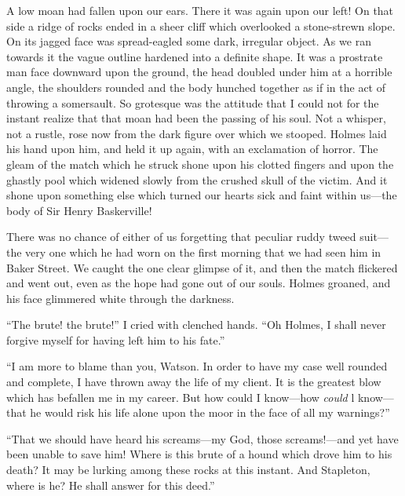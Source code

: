 \documentclass[paper=5.5in:8.5in,BCOR=7mm,twoside,DIV=calc,12pt,usegeometry,openany,chapterprefix,endperiod,headings=big]{scrbook} %
\begin{document}
A low moan had fallen upon our ears. There it was again upon our left! On that side a ridge of rocks ended in a sheer cliff which overlooked a stone-strewn slope. On its jagged face was spread-eagled some dark, irregular object. As we ran towards it the vague outline hardened into a definite shape. It was a prostrate man face downward upon the ground, the head doubled under him at a horrible angle, the shoulders rounded and the body hunched together as if in the act of throwing a somersault. So grotesque was the attitude that I could not for the instant realize that that moan had been the passing of his soul. Not a whisper, not a rustle, rose now from the dark figure over which we stooped. Holmes laid his hand upon him, and held it up again, with an exclamation of horror. The gleam of the match which he struck shone upon his clotted fingers and upon the ghastly pool which widened slowly from the crushed skull of the victim. And it shone upon something else which turned our hearts sick and faint within us---the body of Sir Henry Baskerville!



There was no chance of either of us forgetting that peculiar ruddy tweed suit---the very one which he had worn on the first morning that we had seen him in Baker Street. We caught the one clear glimpse of it, and then the match flickered and went out, even as the hope had gone out of our souls. Holmes groaned, and his face glimmered white through the darkness.

\enquote{The brute! the brute!} I cried with clenched hands. \enquote{Oh Holmes, I shall never forgive myself for having left him to his fate.}

\enquote{I am more to blame than you, Watson. In order to have my case well rounded and complete, I have thrown away the life of my client. It is the greatest blow which has befallen me in my career. But how could I know---how \emph{could} l know---that he would risk his life alone upon the moor in the face of all my warnings?}

\enquote{That we should have heard his screams---my God, those \newline screams!---and yet have been unable to save him! Where is this brute of a hound which drove him to his death? It may be lurking among these rocks at this instant. And Stapleton, where is he? He shall answer for this deed.}
\end{document}
